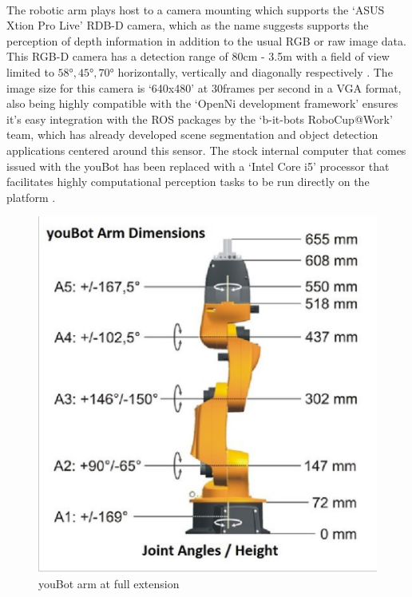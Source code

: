 \paragraph{}The robotic arm plays host to a camera mounting which supports the `ASUS Xtion Pro Live' RDB-D camera, which as the name suggests supports the perception of depth information in addition to the usual RGB or raw image data. This RGB-D camera has a detection range of 80cm - 3.5m with a field of view limited to $\ang{58}, \ang{45}, \ang{70}$ horizontally, vertically and diagonally respectively \cite{swoboda2014comprehensive}. The image size for this camera is `640x480' at 30frames per second in a VGA format, also being highly compatible with the `OpenNi development framework' ensures it's easy integration with the ROS packages by the `b-it-bots RoboCup@Work' team, which has already developed scene segmentation and object detection applications centered around this sensor. The stock internal computer that comes issued with the youBot has been replaced with a `Intel Core i5' processor that facilitates highly computational perception tasks to be run directly on the platform \cite{Roscoe2012}. 

\begin{figure}[h]
	\centering
	\includegraphics[scale=0.5]{images/youbot_arm}
	\caption{youBot arm at full extension}
	\label{fig:youbotarm}
\end{figure}

